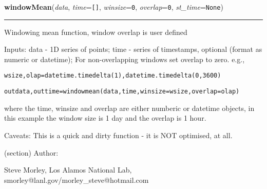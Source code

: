     \label{spacepy:toolbox:windowMean}

    \vspace{0.5ex}

\hspace{.8\funcindent}\begin{boxedminipage}{\funcwidth}

    \raggedright \textbf{windowMean}(\textit{data}, \textit{time}={\tt \texttt{[}\texttt{]}}, \textit{winsize}={\tt 0}, \textit{overlap}={\tt 0}, \textit{st\_time}={\tt None})

    \vspace{-1.5ex}

    \rule{\textwidth}{0.5\fboxrule}
\setlength{\parskip}{2ex}
    Windowing mean function, window overlap is user defined

    Inputs: data - 1D series of points; time - series of timestamps, 
    optional (format as numeric or datetime); For non-overlapping windows 
    set overlap to zero. e.g.,

\begin{alltt}
\pysrcprompt{{\textgreater}{\textgreater}{\textgreater} }wsize, olap = datetime.timedelta(1), datetime.timedelta(0,3600)\end{alltt}
\begin{alltt}
\pysrcprompt{{\textgreater}{\textgreater}{\textgreater} }outdata, outtime = windowmean(data, time, winsize=wsize, overlap=olap)\end{alltt}
    where the time, winsize and overlap are either numberic or datetime 
    objects, in this example the window size is 1 day and the overlap is 1 
    hour.

    Caveats: This is a quick and dirty function - it is NOT optimised, at 
    all.

    (section) Author:

      Steve Morley, Los Alamos National Lab, 
      smorley@lanl.gov/morley\_steve@hotmail.com

\setlength{\parskip}{1ex}
    \end{boxedminipage}

    \label{spacepy:toolbox:medAbsDev}

    \vspace{0.5ex}

